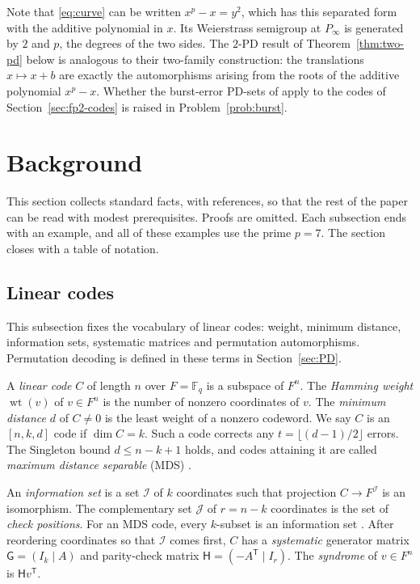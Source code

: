 \documentclass[12pt,letterpaper]{article}
\theoremstyle{definition}
\theoremstyle{remark}
\numberwithin{equation}{section}
\newcommand{\F}{\mathbb{F}}
\newcommand{\wt}{\operatorname{wt}}
\newcommand{\Gsys}{\mathsf{G}}
\newcommand{\Hsys}{\mathsf{H}}
\newcommand{\cI}{\mathcal{I}}
\newcommand{\cJ}{\mathcal{J}}
\begin{document}
Note that \eqref{eq:curve} can be written $x^p-x=y^2$, which has this
separated form with the additive polynomial in $x$.  Its Weierstrass
semigroup at $P_\infty$ is generated by $2$ and $p$, the degrees of the
two sides.  The $2$-PD result of Theorem~\ref{thm:two-pd} below is analogous to
their two-family construction: the translations $x\mapsto x+b$ are
exactly the automorphisms arising from the roots of the additive
polynomial $x^p-x$.  Whether the burst-error PD-sets of \cite{CTO26,LLMS26} apply to
the codes of Section~\ref{sec:fp2-codes} is raised in
Problem~\ref{prob:burst}.

\section{Background}\label{sec:background}

This section collects standard facts, with references, so that the rest
of the paper can be read with modest prerequisites.  Proofs are omitted.
Each subsection ends with an example, and all of these examples use the
prime $p=7$. The section closes with a table of notation.

\subsection{Linear codes}\label{subsec:bg-codes}
This subsection fixes the vocabulary of linear codes: weight, minimum
distance, information sets, systematic matrices and permutation
automorphisms. Permutation decoding is defined in these terms in
Section~\ref{sec:PD}.

A \emph{linear code} $C$ of length $n$ over $F=\F_q$ is a subspace of
$F^n$.  The \emph{Hamming weight} $\wt(v)$ of $v\in F^n$ is the number of
nonzero coordinates of $v$.  The \emph{minimum distance} $d$ of $C\neq0$
is the least weight of a nonzero codeword.  We say $C$ is an $[n,k,d]$
code if $\dim C=k$.  Such a code corrects any $t=\lfloor(d-1)/2\rfloor$
errors.  The Singleton bound $d\le n-k+1$ holds, and codes attaining it
are called \emph{maximum distance separable} (MDS) \cite{HP03,MS77}.

An \emph{information set} is a set $\cI$ of $k$ coordinates such that
projection $C\to F^{\cI}$ is an isomorphism.  The complementary set
$\cJ$ of $r=n-k$ coordinates is the set of \emph{check positions}.  For
an MDS code, every $k$-subset is an information set \cite[Ch.~11]{MS77}.
After reordering coordinates so that $\cI$ comes first, $C$ has a
\emph{systematic} generator matrix $\Gsys=(I_k\mid A)$ and parity-check
matrix $\Hsys=(-A^{\mathsf T}\mid I_r)$.  The \emph{syndrome} of
$v\in F^n$ is $\Hsys v^{\mathsf T}$.
\end{document}
